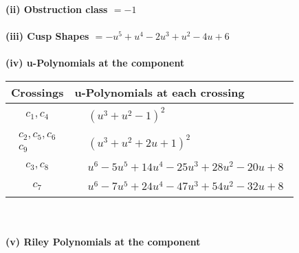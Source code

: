 \documentclass[1p]{elsarticle_modified}
\theoremstyle{definition}
\begin{document}
\flushleft \textbf{(ii) Obstruction class $= -1$}\\~\\
\flushleft \textbf{(iii) Cusp Shapes $= - u^5+u^4-2 u^3+u^2-4 u+6$}\\~\\
\newpage\renewcommand{\arraystretch}{1}
\flushleft \textbf{(iv) u-Polynomials at the component}\newline \\
\begin{tabular}{m{50pt}|m{274pt}}
Crossings & \hspace{64pt}u-Polynomials at each crossing \\
\hline $$\begin{aligned}c_{1},c_{4}\end{aligned}$$&$\begin{aligned}
&(u^3+u^2-1)^2
\end{aligned}$\\
\hline $$\begin{aligned}c_{2},c_{5},c_{6}\\c_{9}\end{aligned}$$&$\begin{aligned}
&(u^3+u^2+2 u+1)^2
\end{aligned}$\\
\hline $$\begin{aligned}c_{3},c_{8}\end{aligned}$$&$\begin{aligned}
&u^6-5 u^5+14 u^4-25 u^3+28 u^2-20 u+8
\end{aligned}$\\
\hline $$\begin{aligned}c_{7}\end{aligned}$$&$\begin{aligned}
&u^6-7 u^5+24 u^4-47 u^3+54 u^2-32 u+8
\end{aligned}$\\
\hline
\end{tabular}\\~\\
\newpage\renewcommand{\arraystretch}{1}
\flushleft \textbf{(v) Riley Polynomials at the component}\newline \\
\end{document}
